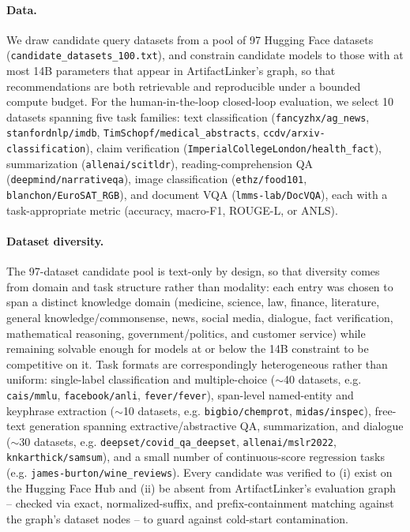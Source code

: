 

\paragraph{Data.} We draw candidate query datasets from a pool of 97 Hugging Face datasets (\texttt{candidate\_datasets\_100.txt}), and constrain candidate models to those with at most 14B parameters that appear in ArtifactLinker's graph, so that recommendations are both retrievable and reproducible under a bounded compute budget. For the human-in-the-loop closed-loop evaluation, we select 10 datasets spanning five task families: text classification (\texttt{fancyzhx/ag\_news}, \texttt{stanfordnlp/imdb}, \texttt{TimSchopf/medical\_abstracts}, \texttt{ccdv/arxiv-classification}), claim verification (\texttt{ImperialCollegeLondon/health\_fact}), summarization (\texttt{allenai/scitldr}), reading-comprehension QA (\texttt{deepmind/narrativeqa}), image classification (\texttt{ethz/food101}, \texttt{blanchon/EuroSAT\_RGB}), and document VQA (\texttt{lmms-lab/DocVQA}), each with a task-appropriate metric (accuracy, macro-F1, ROUGE-L, or ANLS).

\paragraph{Dataset diversity.} The 97-dataset candidate pool is text-only by design, so that diversity comes from domain and task structure rather than modality: each entry was chosen to span a distinct knowledge domain (medicine, science, law, finance, literature, general knowledge/commonsense, news, social media, dialogue, fact verification, mathematical reasoning, government/politics, and customer service) while remaining solvable enough for models at or below the 14B constraint to be competitive on it. Task formats are correspondingly heterogeneous rather than uniform: single-label classification and multiple-choice ($\sim$40 datasets, e.g. \texttt{cais/mmlu}, \texttt{facebook/anli}, \texttt{fever/fever}), span-level named-entity and keyphrase extraction ($\sim$10 datasets, e.g. \texttt{bigbio/chemprot}, \texttt{midas/inspec}), free-text generation spanning extractive/abstractive QA, summarization, and dialogue ($\sim$30 datasets, e.g. \texttt{deepset/covid\_qa\_deepset}, \texttt{allenai/mslr2022}, \texttt{knkarthick/samsum}), and a small number of continuous-score regression tasks (e.g. \texttt{james-burton/wine\_reviews}). Every candidate was verified to (i) exist on the Hugging Face Hub and (ii) be absent from ArtifactLinker's evaluation graph -- checked via exact, normalized-suffix, and prefix-containment matching against the graph's dataset nodes -- to guard against cold-start contamination.

